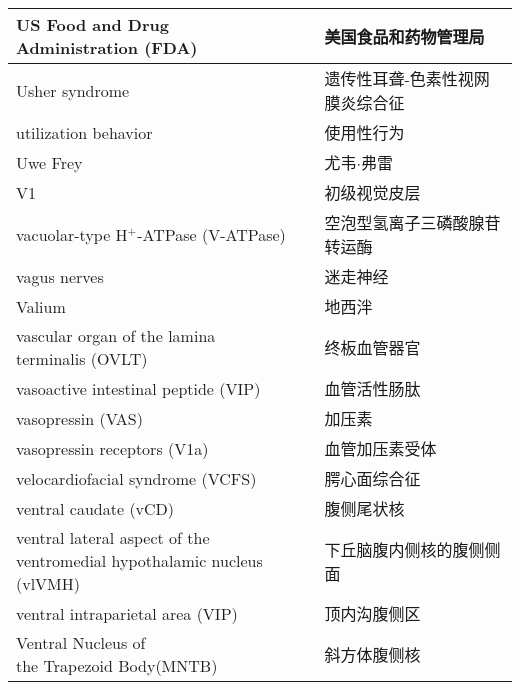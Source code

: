 \begin{longtable}{lll}
	\midrule
	US Food and Drug Administration (FDA)     &&  美国食品和药物管理局  \\
	
	\midrule
	Usher syndrome     &&  遗传性耳聋-色素性视网膜炎综合征  \\
	
	\midrule
	utilization behavior   && 使用性行为  \\
	
	\midrule
	Uwe Frey   && 尤韦$\cdot$弗雷  \\
	
	\midrule
	V1   && 初级视觉皮层  \\
	
	\midrule
	vacuolar-type H$^+$-ATPase (V-ATPase)   && 空泡型氢离子三磷酸腺苷转运酶  \\
	
	\midrule
	vagus nerves   && 迷走神经  \\
	
	\midrule
	Valium   && 地西泮  \\
	
	\midrule
	\makecell[l]{vascular organ of the lamina \\terminalis (OVLT)}   && 终板血管器官  \\
	
	\midrule
	vasoactive intestinal peptide (VIP)  && 血管活性肠肽  \\
	
	\midrule
	vasopressin (VAS)  && 加压素  \\
	
	\midrule
	vasopressin receptors (V1a)  && 血管加压素受体  \\
	
	\midrule
	velocardiofacial syndrome (VCFS)   && 腭心面综合征  \\
	
	\midrule
	ventral caudate (vCD)   && 腹侧尾状核  \\
	
	\midrule
	\makecell[l]{ventral lateral aspect of the \\ventromedial hypothalamic nucleus (vlVMH)}   && 下丘脑腹内侧核的腹侧侧面  \\
	
	\midrule
	ventral intraparietal area (VIP)   && 顶内沟腹侧区  \\
	
	\midrule
	\makecell[l]{Ventral Nucleus of \\the Trapezoid Body(MNTB)}   && 斜方体腹侧核  \\
	

\end{longtable}
